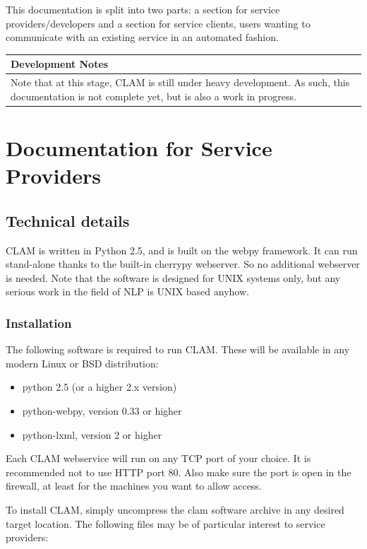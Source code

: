 \documentclass[a4paper,12pt]{report}
\newenvironment{devnotes}
{\newpage
\begin{center}
    \begin{tabular}[h!]{|p{0.8\textwidth}|}
    \hline
    {\bf Development Notes}\\\hline}
{   \\\hline
    \end{tabular}
\end{center}}
\begin{document}
This documentation is split into two parts: a section for service providers/developers and a section for service clients, users wanting to communicate with an existing service in an automated fashion.

\begin{devnotes}
Note that at this stage, CLAM is still under heavy development. As such, this documentation is not complete yet, but is also a work in progress.
\end{devnotes}






\chapter{Documentation for Service Providers}

\section{Technical details}

CLAM is written in Python 2.5, and is built on the webpy framework. It can run stand-alone thanks to the built-in cherrypy webserver. So no additional webserver is needed. Note that the software is designed for UNIX systems only, but any serious work in the field of NLP is UNIX based anyhow. 


\subsection{Installation}

The following software is required to run CLAM. These will be available in any modern Linux or BSD distribution:

\begin{itemize}
\item python 2.5 (or a higher 2.x version)
\item python-webpy, version 0.33 or higher
\item python-lxml, version 2 or higher
\end{itemize}

Each CLAM webservice will run on any TCP port of your choice. It is recommended not to use HTTP port 80. Also make sure the port is open in the firewall, at least for the machines you want to allow access.

To install CLAM, simply uncompress the clam software archive in any desired target location. The following files may be of particular interest to service providers:
\end{document}
